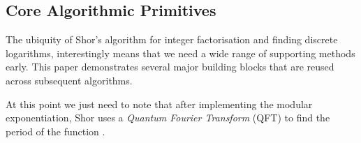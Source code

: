 











\subsection{Core Algorithmic Primitives}

The ubiquity of Shor's algorithm for integer factorisation and finding discrete logarithms,
interestingly means that we need a wide range of supporting methods early.  
This paper demonstrates several major building blocks that are reused across subsequent algorithms.

At this point we just need to note that after implementing the modular exponentiation,
Shor uses a \emph{Quantum Fourier Transform} (QFT) to find the period of the function \cite{Shor:1997}. 

